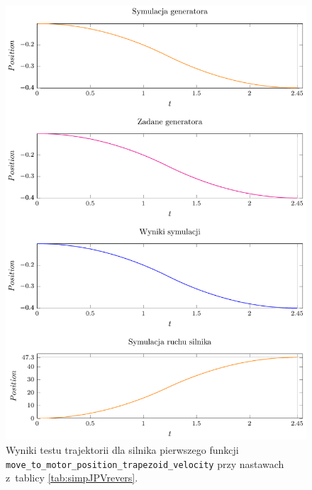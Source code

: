 \documentclass[a4paper, 12pt]{article}
\begin{document}
	\begin{figure}[H]
		\centering
		\includegraphics[scale=1.2]{raport_graphs/simpJPVrevers.pdf}
		\caption{Wyniki testu trajektorii dla silnika pierwszego funkcji \texttt{move\_to\_motor\_position\_trapezoid\_velocity} przy nastawach z~tablicy \ref{tab:simpJPVrevers}.}
		\label{fig:simpJPVrevers}
	\end{figure}
		
\end{document}
